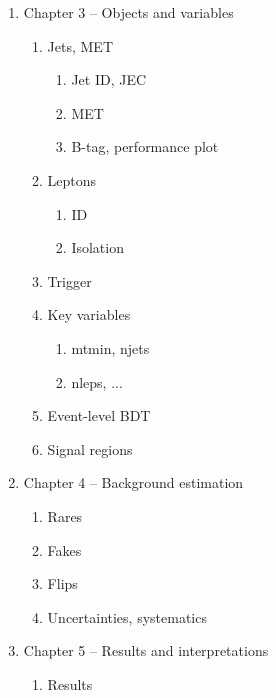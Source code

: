 \begin{enumerate}
	\item Chapter 3 -- Objects and variables
    \begin{enumerate}
    	\item Jets, MET
        \begin{enumerate}
            \item Jet ID, JEC
            \item MET
            \item B-tag, performance plot
        \end{enumerate}
    	\item Leptons
        \begin{enumerate}
            \item ID
            \item Isolation
        \end{enumerate}
    	\item Trigger
    	\item Key variables
        \begin{enumerate}
            \item mtmin, njets
            \item nleps, ...
        \end{enumerate}
    	\item Event-level BDT
    	\item Signal regions
    \end{enumerate}


	\item Chapter 4 -- Background estimation
    \begin{enumerate}
    	\item Rares
    	\item Fakes
    	\item Flips
    	\item Uncertainties, systematics
    \end{enumerate}

	\item Chapter 5 -- Results and interpretations
    \begin{enumerate}
    	\item Results
        \begin{enumerate}
            \item SR plots, tttt
        \end{enumerate}
    	\item SUSY interpretations
        \begin{enumerate}
            \item SMS exclusions
            \item Model-independent limits
        \end{enumerate}
    	\item BSM tttt interpetations
    \end{enumerate}


	\item Chapter 6 -- Summary and conclusions

\end{enumerate}

